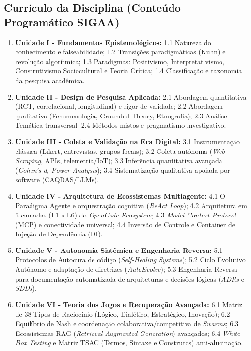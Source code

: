 \documentclass[12pt,a4paper]{article}
\begin{document}
\subsection{Currículo da Disciplina (Conteúdo Programático SIGAA)}
\begin{tcolorbox}[colback=white,colframe=black!75!black,title=\textbf{Matriz Curricular Estrutural}]
\begin{enumerate}
    \item \textbf{Unidade I - Fundamentos Epistemológicos:} 1.1 Natureza do conhecimento e falseabilidade; 1.2 Transições paradigmáticas (Kuhn) e revolução algorítmica; 1.3 Paradigmas: Positivismo, Interpretativismo, Construtivismo Sociocultural e Teoria Crítica; 1.4 Classificação e taxonomia da pesquisa acadêmica.
    \item \textbf{Unidade II - Design de Pesquisa Aplicada:} 2.1 Abordagem quantitativa (RCT, correlacional, longitudinal) e rigor de validade; 2.2 Abordagem qualitativa (Fenomenologia, Grounded Theory, Etnografia); 2.3 Análise Temática transversal; 2.4 Métodos mistos e pragmatismo investigativo.
    \item \textbf{Unidade III - Coleta e Validação na Era Digital:} 3.1 Instrumentação clássica (Likert, entrevistas, grupos focais); 3.2 Coleta autônoma (\textit{Web Scraping}, APIs, telemetria/IoT); 3.3 Inferência quantitativa avançada (\textit{Cohen's d, Power Analysis}); 3.4 Sistematização qualitativa apoiada por software (CAQDAS/LLMs).
    \item \textbf{Unidade IV - Arquitetura de Ecossistemas Multiagente:} 4.1 O Paradigma Agente e orquestração cognitiva (\textit{ReAct Loop}); 4.2 Arquitetura em 6 camadas (L1 a L6) do \textit{OpenCode Ecosystem}; 4.3 \textit{Model Context Protocol} (MCP) e conectividade universal; 4.4 Inversão de Controle e Container de Injeção de Dependência (DI).
    \item \textbf{Unidade V - Autonomia Sistêmica e Engenharia Reversa:} 5.1 Protocolos de Autocura de código (\textit{Self-Healing Systems}); 5.2 Ciclo Evolutivo Autônomo e adaptação de diretrizes (\textit{AutoEvolve}); 5.3 Engenharia Reversa para documentação automatizada de arquiteturas e decisões lógicas (\textit{ADRs} e \textit{SDDs}).
    \item \textbf{Unidade VI - Teoria dos Jogos e Recuperação Avançada:} 6.1 Matriz de 38 Tipos de Raciocínio (Lógico, Dialético, Estratégico, Inovação); 6.2 Equilíbrio de Nash e coordenação colaborativa/competitiva de \textit{Swarms}; 6.3 Ecossistemas RAG (\textit{Retrieval-Augmented Generation}) avançados; 6.4 \textit{White-Box Testing} e Matriz TSAC (Termos, Sintaxe e Construtos) anti-alucinação.
\end{enumerate}
\end{tcolorbox}
\end{document}
